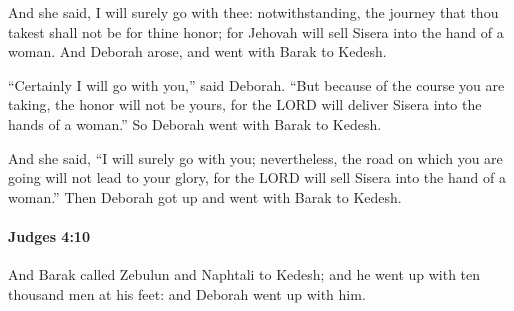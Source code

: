 			\begin{versebox}
					\item[BHS] 
					\item[ASV] And she said, I will surely go with thee: notwithstanding, the journey that thou takest shall not be for thine honor; for Jehovah will sell Sisera into the hand of a woman. And Deborah arose, and went with Barak to Kedesh.
					\item[NIV] “Certainly I will go with you,” said Deborah. “But because of the course you are taking, the honor will not be yours, for the LORD will deliver Sisera into the hands of a woman.” So Deborah went with Barak to Kedesh.
					\item[NRSV] And she said, “I will surely go with you; nevertheless, the road on which you are going will not lead to your glory, for the LORD will sell Sisera into the hand of a woman.” Then Deborah got up and went with Barak to Kedesh.
			\end{versebox}

		\paragraph{Judges 4:10} %
			\label{JUDGES-4-10}

			And Barak called Zebulun and Naphtali to Kedesh; and he went up with ten thousand men at his feet: and Deborah went up with him.

